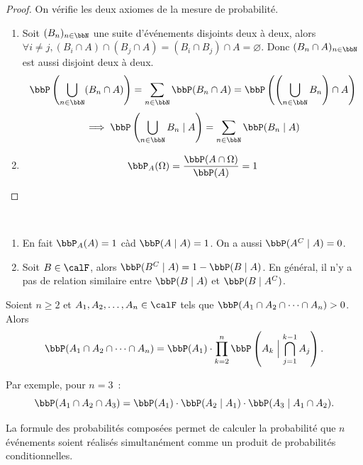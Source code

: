 \begin{proof}
    On vérifie les deux axiomes de la mesure de probabilité.
    \begin{enumerate}
        \item
              Soit $(B_n)_{n \in \bbN}$ une suite d'événements disjoints deux à deux,
              alors $\forall i \neq j, (B_i \cap A) \cap (B_j \cap A) = (B_i \cap B_j) \cap A = \varnothing$.
              Donc $(B_n \cap A)_{n \in \bbN}$ est aussi disjoint deux à deux.
              \[ \bbP \left(\bigcup\limits_{n \in \bbN}(B_n \cap A)\right) = \sum\limits_{n \in \bbN} \bbP(B_n \cap A) = \bbP \left(\left(\bigcup\limits_{n \in \bbN} B_n\right) \cap A\right) \]
              \[ \implies \bbP \left(\bigcup\limits_{n \in \bbN} B_n \mid A\right) = \sum\limits_{n \in \bbN} \bbP(B_n \mid A) \]
        \item
              \[ \bbP_A(\Omega) = \frac{\bbP(A \cap \Omega)}{\bbP(A)} = 1 \]
    \end{enumerate}
\end{proof}

\begin{rqq}
    $\ $
    \begin{enumerate}
        \item En fait $\bbP_A(A) = 1$ càd $\bbP(A \mid A) = 1$. On a aussi $\bbP(A^C \mid A) = 0$.
        \item Soit $B \in \calF$, alors $\bbP(B^C \mid A) = 1 - \bbP(B \mid A)$.
              En général, il n'y a pas de relation similaire entre $\bbP(B \mid A)$ et $\bbP(B \mid A^C)$.
    \end{enumerate}
\end{rqq}

\begin{rqq}
    Soient $n \geqslant 2$ et $A_1, A_2, \ldots, A_n \in \calF$ tels que $\bbP(A_1 \cap A_2 \cap \cdots \cap A_n) > 0$.
    Alors
    \[ \bbP(A_1 \cap A_2 \cap \cdots \cap A_n) =
        \bbP(A_1) \cdot \prod_{k = 2}^n \bbP\left(A_k \mathrel{\Big|} \bigcap_{j = 1}^{k-1} A_j\right). \]
\end{rqq}

\begin{rqq}
    Par exemple, pour $n = 3$~:
    \[ \bbP(A_1 \cap A_2 \cap A_3) = \bbP(A_1) \cdot \bbP(A_2 \mid A_1) \cdot \bbP(A_3 \mid A_1 \cap A_2). \]

    La formule des probabilités composées permet de calculer la probabilité que $n$ événements soient réalisés
    simultanément comme un produit de probabilités conditionnelles.
\end{rqq}


